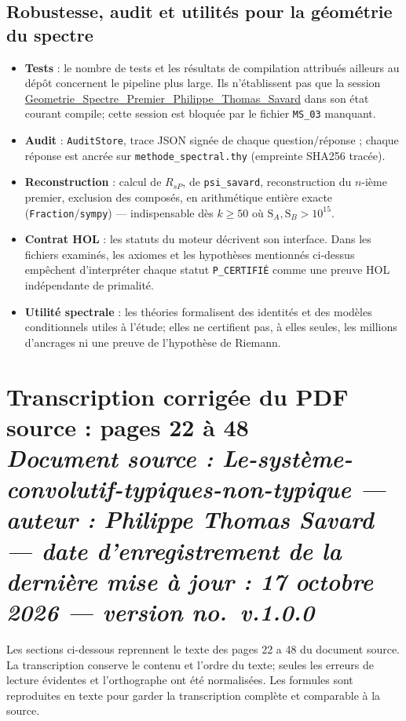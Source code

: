 \documentclass[11pt,a4paper]{article}
\newcommand{\SA}{\mathrm{S}_A}
\newcommand{\SB}{\mathrm{S}_B}
\begin{document}
\begin{samepage}
\subsection{Robustesse, audit et utilités pour la géométrie du spectre}

\begin{itemize}[nosep]
  \item \textbf{Tests} : le nombre de tests et les résultats de compilation attribués ailleurs au dépôt concernent le pipeline plus large. Ils n'établissent pas que la session \url{Geometrie\_Spectre\_Premier\_Philippe\_Thomas\_Savard} dans son état courant compile; cette session est bloquée par le fichier \texttt{MS\_03} manquant.
  \item \textbf{Audit} : \texttt{AuditStore}, trace JSON signée de chaque question/réponse ; chaque réponse est ancrée sur \texttt{methode\_spectral.thy} (empreinte SHA256 tracée).
  \item \textbf{Reconstruction} : calcul de $R_{sP}$, de \texttt{psi\_savard}, reconstruction du $n$-ième premier, exclusion des composés, en arithmétique entière exacte (\texttt{Fraction}/\texttt{sympy}) --- indispensable dès $k \ge 50$ où $\SA, \SB > 10^{15}$.
  \item \textbf{Contrat HOL} : les statuts du moteur décrivent son interface. Dans les fichiers examinés, les axiomes et les hypothèses mentionnés ci-dessus empêchent d'interpréter chaque statut \texttt{P\_CERTIFIÉ} comme une preuve HOL indépendante de primalité.
  \item \textbf{Utilité spectrale} : les théories formalisent des identités et des modèles conditionnels utiles à l'étude; elles ne certifient pas, à elles seules, les millions d'ancrages ni une preuve de l'hypothèse de Riemann.
\end{itemize}
\end{samepage}

\section*{Transcription corrig\'ee du PDF source : pages 22 \`a 48\\[3pt]
{\normalsize\itshape Document source : \og Le-syst\`eme-convolutif-typiques-non-typique \fg{} ---
auteur : Philippe Thomas Savard --- date d'enregistrement de la derni\`ere mise \`a jour :
17 octobre 2026 --- version no.~v.1.0.0}}
Les sections ci-dessous reprennent le texte des pages 22 a 48 du document source. La
transcription conserve le contenu et l'ordre du texte; seules les erreurs de lecture
\'evidentes et l'orthographe ont \'et\'e normalis\'ees. Les formules sont reproduites en
texte pour garder la transcription compl\`ete et comparable \`a la source.
\smallskip
\end{document}
